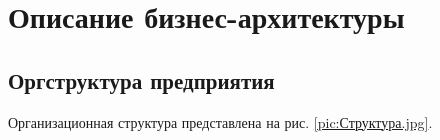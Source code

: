 %
%
\newpage

\chapter{Описание бизнес-архитектуры}

\section{Оргструктура предприятия}

Организационная структура представлена на рис. \ref{pic:Структура.jpg}.

